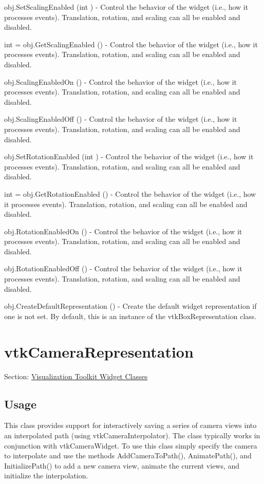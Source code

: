\begin{DoxyItemize}
\item {\ttfamily obj.\-Set\-Scaling\-Enabled (int )} -\/ Control the behavior of the widget (i.\-e., how it processes events). Translation, rotation, and scaling can all be enabled and disabled.  
\item {\ttfamily int = obj.\-Get\-Scaling\-Enabled ()} -\/ Control the behavior of the widget (i.\-e., how it processes events). Translation, rotation, and scaling can all be enabled and disabled.  
\item {\ttfamily obj.\-Scaling\-Enabled\-On ()} -\/ Control the behavior of the widget (i.\-e., how it processes events). Translation, rotation, and scaling can all be enabled and disabled.  
\item {\ttfamily obj.\-Scaling\-Enabled\-Off ()} -\/ Control the behavior of the widget (i.\-e., how it processes events). Translation, rotation, and scaling can all be enabled and disabled.  
\item {\ttfamily obj.\-Set\-Rotation\-Enabled (int )} -\/ Control the behavior of the widget (i.\-e., how it processes events). Translation, rotation, and scaling can all be enabled and disabled.  
\item {\ttfamily int = obj.\-Get\-Rotation\-Enabled ()} -\/ Control the behavior of the widget (i.\-e., how it processes events). Translation, rotation, and scaling can all be enabled and disabled.  
\item {\ttfamily obj.\-Rotation\-Enabled\-On ()} -\/ Control the behavior of the widget (i.\-e., how it processes events). Translation, rotation, and scaling can all be enabled and disabled.  
\item {\ttfamily obj.\-Rotation\-Enabled\-Off ()} -\/ Control the behavior of the widget (i.\-e., how it processes events). Translation, rotation, and scaling can all be enabled and disabled.  
\item {\ttfamily obj.\-Create\-Default\-Representation ()} -\/ Create the default widget representation if one is not set. By default, this is an instance of the vtk\-Box\-Representation class.  
\end{DoxyItemize}\hypertarget{vtkwidgets_vtkcamerarepresentation}{}\section{vtk\-Camera\-Representation}\label{vtkwidgets_vtkcamerarepresentation}
Section\-: \hyperlink{sec_vtkwidgets}{Visualization Toolkit Widget Classes} \hypertarget{vtkwidgets_vtkxyplotwidget_Usage}{}\subsection{Usage}\label{vtkwidgets_vtkxyplotwidget_Usage}
This class provides support for interactively saving a series of camera views into an interpolated path (using vtk\-Camera\-Interpolator). The class typically works in conjunction with vtk\-Camera\-Widget. To use this class simply specify the camera to interpolate and use the methods Add\-Camera\-To\-Path(), Animate\-Path(), and Initialize\-Path() to add a new camera view, animate the current views, and initialize the interpolation.

